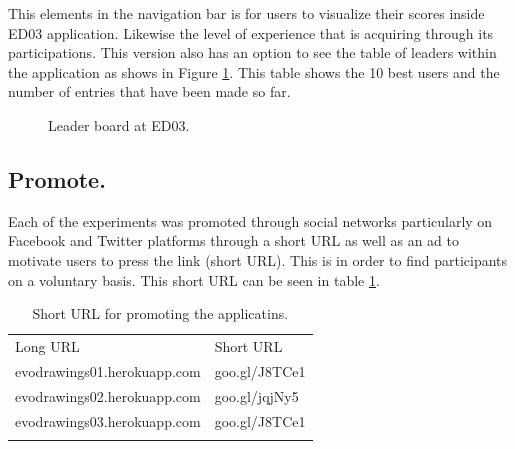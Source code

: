 This elements in the navigation bar is for users to visualize their scores
inside ED03 application. Likewise the level of experience that is acquiring
through its participations. This version also has an option to see the table of
leaders within the application as shows in Figure \ref{fig:leaderBoard}. This
table shows the 10 best users and the number of entries that have been made so
far.


\begin{figure}
\captionsetup{justification=centering,margin=2cm}
\centering
\setlength\fboxsep{0pt}
\setlength\fboxrule{0.7pt}
\caption{Leader board at ED03.}
\label{fig:leaderBoard}
\end{figure}


\subsection{Promote.}

Each of the experiments was promoted through social networks particularly on
Facebook and Twitter platforms through a short URL as well as an ad to motivate
users to press the link (short URL). This is in order to find participants on a
voluntary basis. This short URL can be seen in table \ref{tab:PromoteUrl}.

\begin{table}
\small
\caption{Short URL for promoting the applicatins.}
\label{tab:PromoteUrl}
\centering
\small
\begin{tabular}{p{5cm} p{4cm}  }
\hline\noalign{\smallskip}
 Long URL & Short URL \\
\noalign{\smallskip}\hline\noalign{\smallskip}
\small{evodrawings01.herokuapp.com } & \small{goo.gl/J8TCe1}  \\ \hline
\small{evodrawings02.herokuapp.com } & \small{goo.gl/jqjNy5}  \\ \hline
\small{evodrawings03.herokuapp.com} & \small{goo.gl/J8TCe1}  \\ \hline
\noalign{\smallskip}\hline
\end{tabular}
\end{table}


